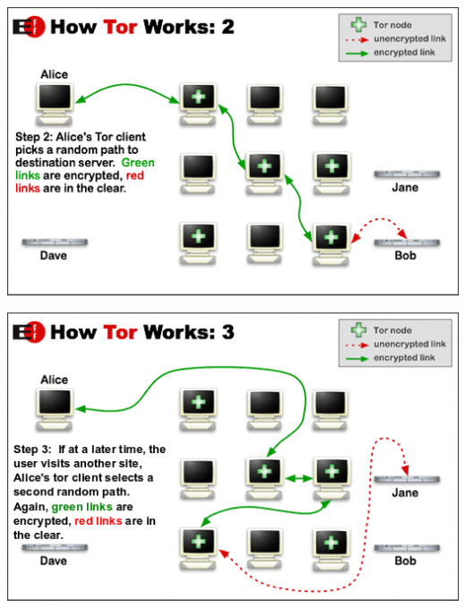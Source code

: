 \documentclass[11pt]{article}
\begin{document}
\begin{center}
\includegraphics[natwidth=510bp,natheight=326bp,width= 0.7\linewidth]{appendix/htw2.png}
\end{center}


\begin{center}
\includegraphics[natwidth=510bp,natheight=326bp,width= 0.7\linewidth]{appendix/htw3.png}
\end{center}

\newpage

\nocite{*}




\end{document}
